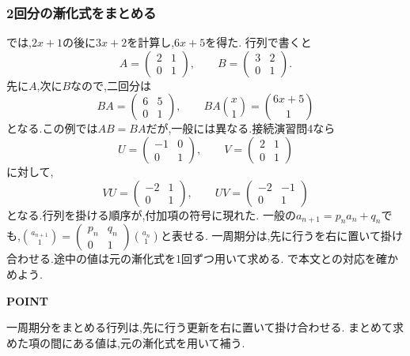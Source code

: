 \subsubsection{2回分の漸化式をまとめる}\label{節：2回分の漸化式をまとめる}
では,$2x+1$の後に$3x+2$を計算し,$6x+5$を得た.
行列で書くと
\[
  A=\begin{pmatrix}2&1\\0&1\end{pmatrix},\qquad
  B=\begin{pmatrix}3&2\\0&1\end{pmatrix}.
\]
先に$A$,次に$B$なので,二回分は
\[
  BA=\begin{pmatrix}6&5\\0&1\end{pmatrix},\qquad
  BA\binom{x}{1}=\binom{6x+5}{1}
\]
となる.この例では$AB=BA$だが,一般には異なる.接続演習問4なら
\[
  U=\begin{pmatrix}-1&0\\0&1\end{pmatrix},\qquad
  V=\begin{pmatrix}2&1\\0&1\end{pmatrix}
\]
に対して,
\[
  VU=\begin{pmatrix}-2&1\\0&1\end{pmatrix},\qquad
  UV=\begin{pmatrix}-2&-1\\0&1\end{pmatrix}
\]
となる.行列を掛ける順序が,付加項の符号に現れた.
一般の$a_{n+1}=p_na_n+q_n$でも,$\binom{a_{n+1}}1=
  \begin{pmatrix}p_n&q_n\\0&1\end{pmatrix}\binom{a_n}1$と表せる.
一周期分は,先に行うを右に置いて掛け合わせる.途中の値は元の漸化式を1回ずつ用いて求める.
で本文との対応を確かめよう.

\begin{bookpoint}
  \textbf{POINT}\par
  一周期分をまとめる行列は,先に行う更新を右に置いて掛け合わせる.
  まとめて求めた項の間にある値は,元の漸化式を用いて補う.
\end{bookpoint}
